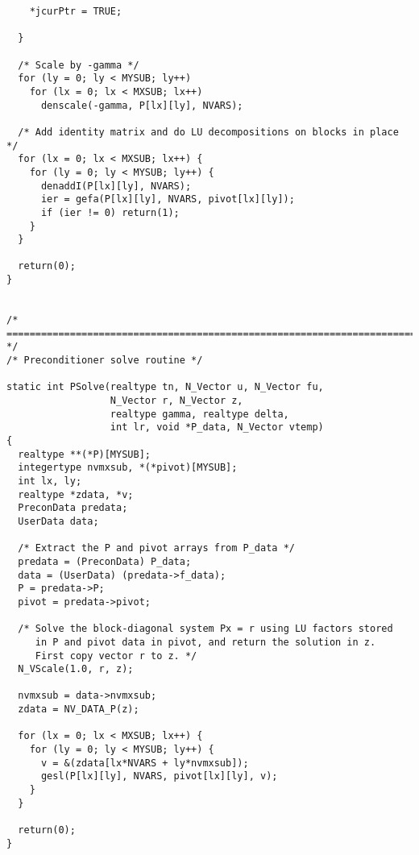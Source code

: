 \begin{verbatim}
    *jcurPtr = TRUE;

  }

  /* Scale by -gamma */
  for (ly = 0; ly < MYSUB; ly++)
    for (lx = 0; lx < MXSUB; lx++)
      denscale(-gamma, P[lx][ly], NVARS);
  
  /* Add identity matrix and do LU decompositions on blocks in place */
  for (lx = 0; lx < MXSUB; lx++) {
    for (ly = 0; ly < MYSUB; ly++) {
      denaddI(P[lx][ly], NVARS);
      ier = gefa(P[lx][ly], NVARS, pivot[lx][ly]);
      if (ier != 0) return(1);
    }
  }
  
  return(0);
}


/* ======================================================================= */
/* Preconditioner solve routine */

static int PSolve(realtype tn, N_Vector u, N_Vector fu, 
                  N_Vector r, N_Vector z, 
                  realtype gamma, realtype delta,
                  int lr, void *P_data, N_Vector vtemp)
{
  realtype **(*P)[MYSUB];
  integertype nvmxsub, *(*pivot)[MYSUB];
  int lx, ly;
  realtype *zdata, *v;
  PreconData predata;
  UserData data;

  /* Extract the P and pivot arrays from P_data */
  predata = (PreconData) P_data;
  data = (UserData) (predata->f_data);
  P = predata->P;
  pivot = predata->pivot;

  /* Solve the block-diagonal system Px = r using LU factors stored
     in P and pivot data in pivot, and return the solution in z.
     First copy vector r to z. */
  N_VScale(1.0, r, z);

  nvmxsub = data->nvmxsub;
  zdata = NV_DATA_P(z);

  for (lx = 0; lx < MXSUB; lx++) {
    for (ly = 0; ly < MYSUB; ly++) {
      v = &(zdata[lx*NVARS + ly*nvmxsub]);
      gesl(P[lx][ly], NVARS, pivot[lx][ly], v);
    }
  }

  return(0);
}
\end{verbatim}